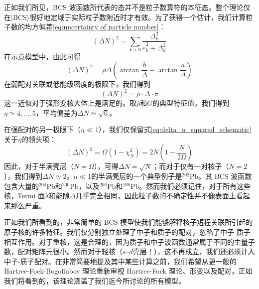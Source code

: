 正如我们所见，BCS 波函数所代表的态并不是粒子数算符的本征态。整个理论仅在$|\text{BCS}\rangle$很好地定域于实际粒子数附近时才有效。为了获得一个估计，我们计算粒子数的均方偏差\ref{eq:uncertainty of particle number}：
\begin{equation}
(\Delta N)^{2}=\sum_{k>0}\frac{\Delta^{2}_{k}}{\tilde{\varepsilon}^{2}_{k}+\Delta^{2}_{k}}\label{eq:delta_n_squared_definition}
\end{equation}
在示意模型中，由此可得
\begin{equation}
(\Delta N)^{2}=\bar{\rho}\Delta\left(\arctan\frac{b}{\Delta}-\arctan\frac{a}{\Delta}\right)\label{eq:delta_n_squared_schematic}
\end{equation}
在弱配对关联或低能级密度的极限下，我们得到
\begin{equation}
(\Delta N)^{2}=\bar{\rho}\cdot\Delta\cdot\pi\label{eq:delta_n_weak_pairing}
\end{equation}
这一近似对于强形变核大体上是满足的。取$\bar{\rho}$和$G$的典型特征值，我们得到$\eta\simeq4,\dots,5$，平均偏差为$\Delta N\simeq\sqrt{6}$。

在强配对的另一极限下（$\eta\ll1$），我们仅保留式\ref{eq:delta_n_squared_schematic}关于$\eta$的领头项：
\begin{equation}
(\Delta N)^{2}=\Omega(1-\chi^{2}_{N})=2N\left(1-\frac{N}{2\Omega}\right)\label{eq:delta_n_strong_pairing}
\end{equation}
因此，对于半满壳层（$N=\Omega$），可得$\Delta N=\sqrt{N}$；而对于仅有一对核子（$N=2$），我们得到$\Delta N\simeq2$。$\eta\ll1$的半满壳层的一个典型例子是$^{202}\text{Pb}$。其
BCS 波函数包含大量的$^{204}\text{Pb}$和$^{200}\text{Pb}$，以及$^{206}\text{Pb}$和$^{198}\text{Pb}$。然而我们必须记住，对于所有这些核，Fermi
面$\lambda$和能隙$\Delta$几乎完全相同，因此粒子数的不确定性并不像表面上看起来那么严重。

正如我们所看到的，非常简单的 BCS 模型使我们能够解释核子短程关联所引起的原子核的许多特征。我们仅分别独立处理了中子和质子的配对，忽略了中子-质子相互作用。对于重核，这是合理的，因为质子和中子波函数通常属于不同的主量子数，配对矩阵元很小。然而对于轻核（$s\text{--}d$壳层！），这不再成立，我们还必须计入中子-质子配对。在非常简要地提及其中某些计算之前，我们希望从更一般的
Hartree-Fock-Bogoliubov 理论重新审视 Hartree-Fock 理论、形变以及配对，正如我们将看到的，该理论涵盖了我们迄今所讨论的所有模型。

